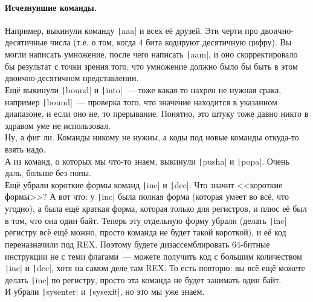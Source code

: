 \documentclass{article}
\begin{document}
    \paragraph{Исчезнувшие команды.}
    Например, выкинули команду \texttt|aaa| и всех её друзей. Эти черти про двоично-десятичные числа (т.е. о том, когда 4 бита кодируют десятичную цифру). Вы могли написать умножение, после чего написать \texttt|aam|, и оно скорректировало бы результат с точки зрения того, что умножение должно было бы быть в этом двоично-десятичном представлении.\\
    Ещё выкинули \texttt|bound| и \texttt|into|~--- тоже какая-то нахрен не нужная срака, например \texttt|bound|~--- проверка того, что значение находится в указанном диапазоне, и если оно не, то прерывание. Понятно, это штуку тоже давно никто в здравом уме не использовал.\\
    Ну, а фиг ли. Команды никому не нужны, а коды под новые команды откуда-то взять надо.\\
    А из команд, о которых мы что-то знаем, выкинули \texttt|pusha| и \texttt|popa|. Очень даль, больше без попы.\\
    Ещё убрали короткие формы команд \texttt|inc| и \texttt|dec|. Что значит <<короткие формы>>? А вот что: у \texttt|inc| была полная форма (которая умеет во всё, что угодно), а была ещё краткая форма, которая только для регистров, и плюс её был в том, что она один байт. Теперь эту отдельную форму убрали (делать \texttt|inc| регистру всё ещё можно, просто команда не будет такой короткой), и её код переназначили под REX. Поэтому будете дизассемблировать 64-битные инструкции не с теми флагами~--- можете получить код с большим количеством \texttt|inc| и \texttt|dec|, хотя на самом деле там REX. То есть повторю: вы всё ещё можете делать \texttt|inc| по регистру, просто эта команда не будет занимать один байт.\\
    И убрали \texttt|sysenter| и \texttt|sysexit|, но это мы уже знаем.
\end{document}
